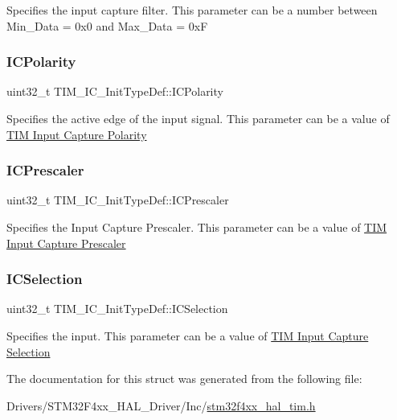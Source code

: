 Specifies the input capture filter. This parameter can be a number between Min\+\_\+\+Data = 0x0 and Max\+\_\+\+Data = 0xF \mbox{\label{struct_t_i_m___i_c___init_type_def_ab122383ebc0926c49a814546471da9b3}} 
\subsubsection{\texorpdfstring{I\+C\+Polarity}{ICPolarity}}
{\footnotesize\ttfamily uint32\+\_\+t T\+I\+M\+\_\+\+I\+C\+\_\+\+Init\+Type\+Def\+::\+I\+C\+Polarity}

Specifies the active edge of the input signal. This parameter can be a value of \hyperlink{group___t_i_m___input___capture___polarity}{T\+IM Input Capture Polarity} \mbox{\label{struct_t_i_m___i_c___init_type_def_a452a4a459b6f7b7c478db032de9b0d72}} 
\subsubsection{\texorpdfstring{I\+C\+Prescaler}{ICPrescaler}}
{\footnotesize\ttfamily uint32\+\_\+t T\+I\+M\+\_\+\+I\+C\+\_\+\+Init\+Type\+Def\+::\+I\+C\+Prescaler}

Specifies the Input Capture Prescaler. This parameter can be a value of \hyperlink{group___t_i_m___input___capture___prescaler}{T\+IM Input Capture Prescaler} \mbox{\label{struct_t_i_m___i_c___init_type_def_aad80556490de79727ba1269c851e9724}} 
\subsubsection{\texorpdfstring{I\+C\+Selection}{ICSelection}}
{\footnotesize\ttfamily uint32\+\_\+t T\+I\+M\+\_\+\+I\+C\+\_\+\+Init\+Type\+Def\+::\+I\+C\+Selection}

Specifies the input. This parameter can be a value of \hyperlink{group___t_i_m___input___capture___selection}{T\+IM Input Capture Selection} 

The documentation for this struct was generated from the following file\+:\begin{DoxyCompactItemize}
\item 
Drivers/\+S\+T\+M32\+F4xx\+\_\+\+H\+A\+L\+\_\+\+Driver/\+Inc/\hyperlink{stm32f4xx__hal__tim_8h}{stm32f4xx\+\_\+hal\+\_\+tim.\+h}\end{DoxyCompactItemize}
